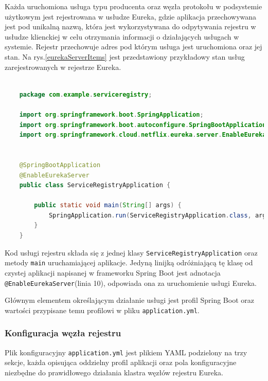 Każda uruchomiona usługa typu producenta oraz węzła protokołu w podsystemie użytkowym jest rejestrowana w usłudze Eureka, gdzie aplikacja przechowywana jest pod unikalną nazwą, która jest wykorzystywana do odpytywania rejestru w usłudze klienckiej w celu otrzymania informacji o działających usługach w systemie. Rejestr przechowuje adres pod którym usługa jest uruchomiona oraz jej stan. Na rys.\ref{eurekaServerItems} jest przedstawiony przykładowy stan usług zarejestrowanych w rejestrze Eureka.

\begin{lstlisting}[language=Java, caption=Implementacja rejestru usług serwera Eureka]
    
    package com.example.serviceregistry;
    
    import org.springframework.boot.SpringApplication;
    import org.springframework.boot.autoconfigure.SpringBootApplication;
    import org.springframework.cloud.netflix.eureka.server.EnableEurekaServer;
    
    
    @SpringBootApplication
    @EnableEurekaServer
    public class ServiceRegistryApplication {
    
    	public static void main(String[] args) {
    		SpringApplication.run(ServiceRegistryApplication.class, args);
    	}
    }
\end{lstlisting}

Kod usługi rejestru składa się z jednej klasy \verb|ServiceRegistryApplication| oraz metody \verb|main| uruchamiającej aplikacje. Jedyną linijką odróżniającą tę klasę od czystej aplikacji napisanej w frameworku Spring Boot jest adnotacja \verb|@EnableEurekaServer|(linia 10), odpowiada ona za uruchomienie usługi Eureka.

Głównym elementem określającym działanie usługi jest profil Spring Boot oraz wartości przypisane temu profilowi w pliku \verb|application.yml|. 

\subsubsection{Konfiguracja węzła rejestru}

Plik konfiguracyjny \verb|application.yml| jest plikiem YAML podzielony na trzy sekcje, każda opisująca oddzielny profil aplikacji oraz  pola konfiguracyjne niezbędne do prawidłowego działania klastra węzłów rejestru Eureka. 

